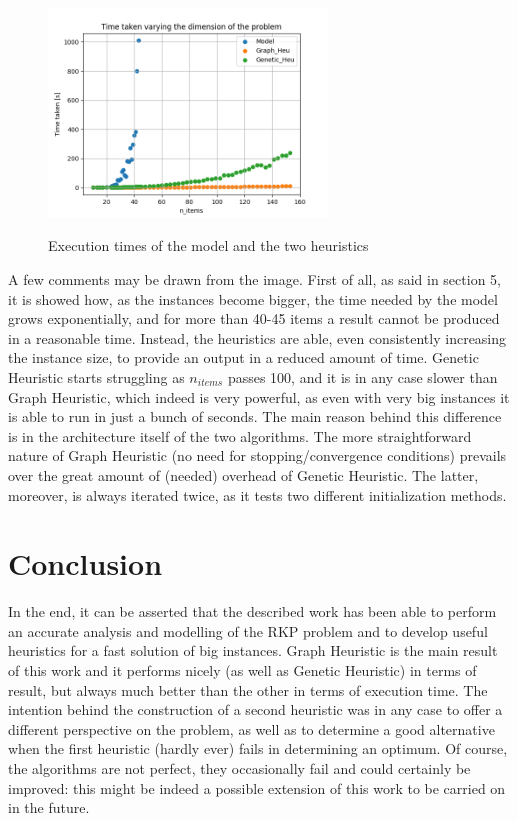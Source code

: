 \documentclass{article}
\begin{document}
\begin{figure}[!ht]
\centering
{\includegraphics[width=0.66\textwidth]{times.png}}
\caption{Execution times of the model and the two heuristics}
\label{times}
\end{figure}

A few comments may be drawn from the image. First of all, as said in section 5, it is showed how, as the instances become bigger, the time needed by the model grows exponentially, and for more than 40-45 items a result cannot be produced in a reasonable time. Instead, the heuristics are able, even consistently increasing the instance size, to provide an output in a reduced amount of time. Genetic Heuristic starts struggling as $n_{items}$ passes 100, and it is in any case slower than Graph Heuristic, which indeed is very powerful, as even with very big instances it is able to run in just a bunch of seconds. The main reason behind this difference is in the architecture itself of the two algorithms. The more straightforward nature of Graph Heuristic (no need for stopping/convergence conditions) prevails over the great amount of (needed) overhead of Genetic Heuristic. The latter, moreover, is always iterated twice, as it tests two different initialization methods. 

\section{Conclusion}
In the end, it can be asserted that the described work has been able to perform an accurate analysis and modelling of the RKP problem and to develop useful heuristics for a fast solution of big instances. 
Graph Heuristic is the main result of this work and it performs nicely (as well as Genetic Heuristic) in terms of result, but always much better than the other in terms of execution time. 
The intention behind the construction of a second heuristic was in any case to offer a different perspective on the problem, as well as to determine a good alternative when the first heuristic (hardly ever) fails in determining an optimum.
Of course, the algorithms are not perfect, they occasionally fail and could certainly be improved: this might be indeed a possible extension of this work to be carried on in the future.

\printbibliography
\end{document}
